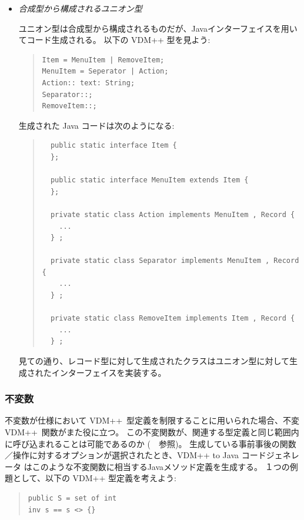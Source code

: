 \documentclass[\pformat,11pt]{jarticle}
\newcommand{\langmancite}{\cite{LangManPP-CSK}}
\newcommand{\VDM}{VDM++}
\newcommand{\cg}{VDM++ to Java コードジェネレータ}
\begin{document}
\begin{itemize}
\item {\em 合成型から構成されるユニオン型}

ユニオン型は合成型から構成されるものだが、Javaインターフェイスを用いてコード生成される。
以下の VDM++ 型を見よう:

\begin{quote}
\begin{verbatim}
Item = MenuItem | RemoveItem;
MenuItem = Seperator | Action;
Action:: text: String;
Separator::;
RemoveItem::;
\end{verbatim}
\end{quote}

生成された Java コードは次のようになる:

\begin{quote}
\begin{small}
\begin{verbatim}
  public static interface Item {
  };

  public static interface MenuItem extends Item {
  };

  private static class Action implements MenuItem , Record {
    ...
  } ;

  private static class Separator implements MenuItem , Record {
    ...
  } ;

  private static class RemoveItem implements Item , Record {
    ...
  } ;
\end{verbatim}
\end{small}
\end{quote}

見ての通り、レコード型に対して生成されたクラスはユニオン型に対して生成されたインターフェイスを実装する。
\end{itemize}

\subsubsection{不変数}

不変数が仕様において \VDM\ 型定義を制限することに用いられた場合、不変 \VDM\ 関数がまた役に立つ。
この不変関数が、関連する型定義と同じ範囲内に呼び込まれることは可能であるのか (\langmancite　参照)。
生成している事前事後の関数／操作に対するオプションが選択されたとき、\cg{} はこのような不変関数に相当するJavaメソッド定義を生成する。
１つの例題として、以下の \VDM{} 型定義を考えよう:

\begin{quote}
\begin{verbatim}
public S = set of int
inv s == s <> {}
\end{verbatim}
\end{quote}
\end{document}
